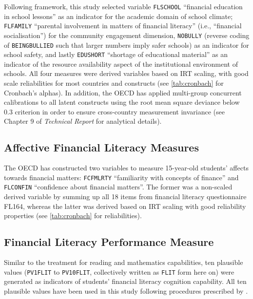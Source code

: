 \documentclass[a4paper,11pt,UKenglish,twoside,openright]{report}\usepackage[]{graphicx}\usepackage[]{color}
\begin{document}
Following  framework, this study selected variable \texttt{FLSCHOOL} ``financial education in school lessons'' as an indicator for the academic domain of school climate; \texttt{FLFAMILY} ``parental involvement in matters of financial literacy'' (i.e., ``financial socialisation'') for the community engagement dimension, \texttt{NOBULLY} (reverse coding of \texttt{BEINGBULLIED} such that larger numbers imply safer schools) as an indicator for school safety, and lastly \texttt{EDUSHORT} ``shortage of educational material'' as an indicator of the resource availability aspect of the institutional environment of schools. All four measures were derived variables based on IRT scaling, with good scale reliabilities for most countries and constructs (see \cref{tab:cronbach} for Cronbach's alphas). In addition, the OECD has applied multi-group concurrent calibrations to all latent constructs using the root mean square deviance below $0.3$ criterion \parencite[for a technical discussion on RMSD, see][p. 244]{buchholz:2019} in order to ensure cross-country measurement invariance (see Chapter 9 of \textit{Technical Report} \parencite[][pp. 14--15]{PISAtech} for analytical details).



\subsection{Affective Financial Literacy Measures}

The OECD has constructed two variables to measure 15-year-old students' affects towards financial matters: \texttt{FCFMLRTY} ``familiarity with concepts of finance'' and \texttt{FLCONFIN} ``confidence about financial matters''. The former was a non-scaled derived variable by summing up all 18 items from financial literacy questionnaire \textsf{FL164}, whereas the latter was derived based on IRT scaling with good reliability properties (see \cref{tab:cronbach} for reliabilities).

\subsection{Financial Literacy Performance Measure}

Similar to the treatment for reading and mathematics capabilities, ten plausible values (\texttt{PV1FLIT} to \texttt{PV10FLIT}, collectively written as \texttt{FLIT} form here on) were generated as indicators of students' financial literacy cognition capability. All ten plausible values have been used in this study following procedures prescribed by \textcite{rubin:1987}.
\end{document}

